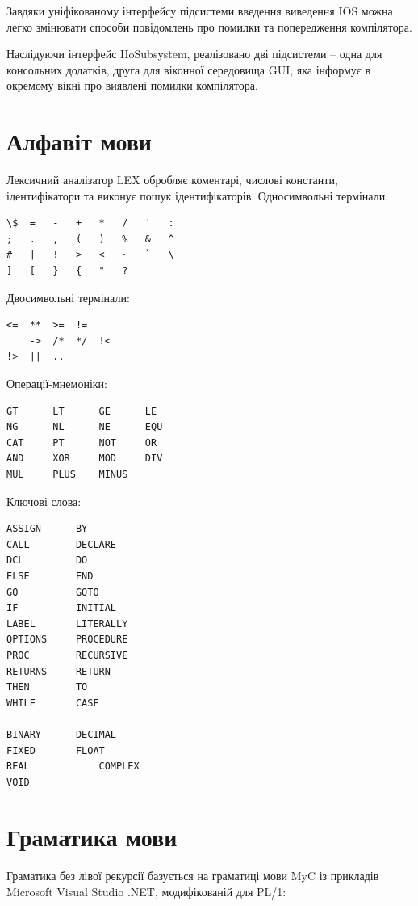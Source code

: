 \documentclass{memoir}
\begin{document}
Завдяки уніфікованому інтерфейсу підсистеми введення виведення IOS можна легко змінювати способи повідомлень про помилки та попередження компілятора.

Наслідуючи інтерфейс IIoSubsystem, реалізовано дві підсистеми – одна для консольних додатків, друга для віконної середовища GUI, яка інформує в окремому вікні про виявлені помилки компілятора.

\newpage
\section{Алфавіт мови}
Лексичний аналізатор LEX обробляє коментарі, числові константи, ідентифікатори та виконує пошук ідентифікаторів. Односимвольні термінали:

\begin{lstlisting}
\$	=	-	+	*	/	'	:
;	.	,	(	)	%	&	^
#	|	!	>	<	~	`	\
]	[	}	{	"	?	_
\end{lstlisting}

Двосимвольні термінали:

\begin{lstlisting}
<=	**	>=	!=
	->	/*	*/	!<
!>	||	..
\end{lstlisting}

Операції-мнемоніки:
\begin{lstlisting}
GT   	LT   	GE   	LE   
NG   	NL   	NE   	EQU  
CAT  	PT   	NOT  	OR   
AND  	XOR  	MOD  	DIV  
MUL  	PLUS 	MINUS
\end{lstlisting}

Ключові слова:

\begin{lstlisting}
ASSIGN   	BY       
CALL     	DECLARE  
DCL      	DO       
ELSE     	END      
GO       	GOTO     
IF       	INITIAL  
LABEL    	LITERALLY
OPTIONS  	PROCEDURE
PROC     	RECURSIVE
RETURNS  	RETURN   
THEN     	TO       
WHILE    	CASE

BINARY		DECIMAL
FIXED		FLOAT
REAL			COMPLEX
VOID
\end{lstlisting}

\newpage
\section{Граматика мови}
Граматика без лівої рекурсії базується на граматиці мови MyC
із прикладів Microsoft Visual Studio .NET, модифікованій для PL/1:
\end{document}
